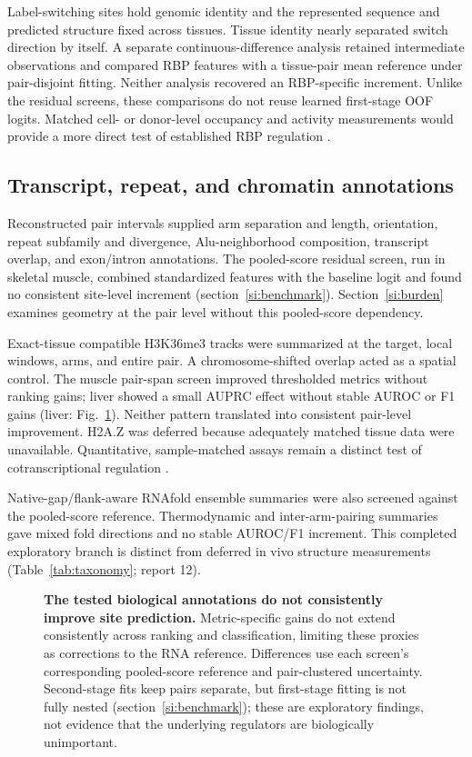 \documentclass[9pt,twoside]{pnas-new}
\begin{document}
Label-switching sites hold genomic identity and the represented sequence and predicted structure fixed across tissues. Tissue identity nearly separated switch direction by itself. A separate continuous-difference analysis retained intermediate observations and compared RBP features with a tissue-pair mean reference under pair-disjoint fitting. Neither analysis recovered an RBP-specific increment. Unlike the residual screens, these comparisons do not reuse learned first-stage OOF logits. Matched cell- or donor-level occupancy and activity measurements would provide a more direct test of established RBP regulation \cite{Freund2020,QuinonesValdez2019,Park2026,Yi2026}.

\subsection*{Transcript, repeat, and chromatin annotations}

Reconstructed pair intervals supplied arm separation and length, orientation, repeat subfamily and divergence, Alu-neighborhood composition, transcript overlap, and exon/intron annotations. The pooled-score residual screen, run in skeletal muscle, combined standardized features with the baseline logit and found no consistent site-level increment (section~\ref{si:benchmark}). Section~\ref{si:burden} examines geometry at the pair level without this pooled-score dependency.

Exact-tissue compatible H3K36me3 tracks were summarized at the target, local windows, arms, and entire pair. A chromosome-shifted overlap acted as a spatial control. The muscle pair-span screen improved thresholded metrics without ranking gains; liver showed a small AUPRC effect without stable AUROC or F1 gains (liver: Fig.~\ref{fig:s2}). Neither pattern translated into consistent pair-level improvement. H2A.Z was deferred because adequately matched tissue data were unavailable. Quantitative, sample-matched assays remain a distinct test of cotranscriptional regulation \cite{Cai2026,ENCODE2020}.

Native-gap/flank-aware RNAfold ensemble summaries were also screened against the pooled-score reference. Thermodynamic and inter-arm-pairing summaries gave mixed fold directions and no stable AUROC/F1 increment. This completed exploratory branch is distinct from deferred in vivo structure measurements (Table~\ref{tab:taxonomy}; report 12).

\begin{figure}[H]
\centering

\caption{\textbf{The tested biological annotations do not consistently improve site prediction.} Metric-specific gains do not extend consistently across ranking and classification, limiting these proxies as corrections to the RNA reference. Differences use each screen's corresponding pooled-score reference and pair-clustered uncertainty. Second-stage fits keep pairs separate, but first-stage fitting is not fully nested (section~\ref{si:benchmark}); these are exploratory findings, not evidence that the underlying regulators are biologically unimportant.}
\label{fig:s2}
\end{figure}
\end{document}
